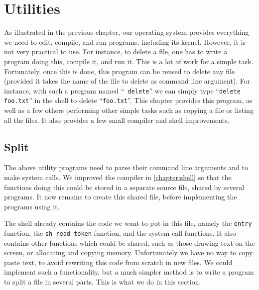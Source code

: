 
\renewcommand{\rustfile}{chapter7}
\setcounter{rustid}{0}


\chapter{Utilities}\label{chapter:utilities}

As illustrated in the previous chapter, our operating system provides
everything we need to edit, compile, and run programs, including its kernel.
However, it is not very practical to use. For instance, to delete a file, one
has to write a program doing this, compile it, and run it. This is a lot of
work for a simple task. Fortunately, once this is done, this program can be
reused to delete any file (provided it takes the name of the file to delete as
command line argument). For instance, with such a program named ``{\tt
delete}'' we can simply type ``{\tt delete foo.txt}'' in the shell to delete
``{\tt foo.txt}''. This chapter provides this program, as well as a few others
performing other simple tasks such as copying a file or listing all the files.
It also provides a few small compiler and shell improvements.

\section{Split}

The above utility programs need to parse their command line arguments and to
make system calls. We improved the compiler in \cref{chapter:shell} so that
the functions doing this could be stored in a separate source file, shared by
several programs. It now remains to create this shared file, before
implementing the programs using it.

The shell already contains the code we want to put in this file, namely the
{\tt entry} function, the {\tt sh\_read\_token} function, and the system call
functions. It also contains other functions which could be shared, such as
those drawing text on the screen, or allocating and copying memory.
Unfortunately we have no way to copy paste text, to avoid rewriting this code
from scratch in new files. We could implement such a functionality, but a much
simpler method is to write a program to split a file in several parts. This is
what we do in this section.


